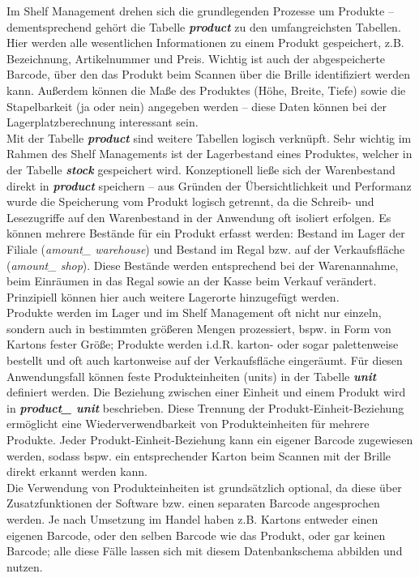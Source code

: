 Im Shelf Management drehen sich die grundlegenden Prozesse um Produkte -- dementsprechend gehört die Tabelle \textit{\textbf{product}} zu den umfangreichsten Tabellen. Hier werden alle wesentlichen Informationen zu einem Produkt gespeichert, z.B. Bezeichnung, Artikelnummer und Preis. Wichtig ist auch der abgespeicherte Barcode, über den das Produkt beim Scannen über die Brille identifiziert werden kann. Außerdem können die Maße des Produktes (Höhe, Breite, Tiefe) sowie die Stapelbarkeit (ja oder nein) angegeben werden -- diese Daten können bei der Lagerplatzberechnung interessant sein.\\

Mit der Tabelle \textit{\textbf{product}} sind weitere Tabellen logisch verknüpft. Sehr wichtig im Rahmen des Shelf Managements ist der Lagerbestand eines Produktes, welcher in der Tabelle \textit{\textbf{stock}} gespeichert wird. Konzeptionell ließe sich der Warenbestand direkt in \textit{\textbf{product}} speichern -- aus Gründen der Übersichtlichkeit und Performanz wurde die Speicherung vom Produkt logisch getrennt, da die Schreib- und Lesezugriffe auf den Warenbestand in der Anwendung oft isoliert erfolgen. Es können mehrere Bestände für ein Produkt erfasst werden: Bestand im Lager der Filiale (\textit{amount\_ warehouse}) und Bestand im Regal bzw. auf der Verkaufsfläche (\textit{amount\_ shop}). Diese Bestände werden entsprechend bei der Warenannahme, beim Einräumen in das Regal sowie an der Kasse beim Verkauf verändert. Prinzipiell können hier auch weitere Lagerorte hinzugefügt werden.\\

Produkte werden im Lager und im Shelf Management oft nicht nur einzeln, sondern auch in bestimmten größeren Mengen prozessiert, bspw. in Form von Kartons fester Größe; Produkte werden i.d.R. karton- oder sogar palettenweise bestellt und oft auch kartonweise auf der Verkaufsfläche eingeräumt. Für diesen Anwendungsfall können feste Produkteinheiten (\glqq units\grqq ) in der Tabelle \textit{\textbf{unit}} definiert werden. Die Beziehung zwischen einer Einheit und einem Produkt wird in \textit{\textbf{product\_ unit}} beschrieben. Diese Trennung der Produkt-Einheit-Beziehung ermöglicht eine Wiederverwendbarkeit von Produkteinheiten für mehrere Produkte. Jeder Produkt-Einheit-Beziehung kann ein eigener Barcode zugewiesen werden, sodass bspw. ein entsprechender Karton beim Scannen mit der Brille direkt erkannt werden kann.\\

Die Verwendung von Produkteinheiten ist grundsätzlich optional, da diese über Zusatzfunktionen der Software bzw. einen separaten Barcode angesprochen werden. Je nach Umsetzung im Handel haben z.B. Kartons entweder einen eigenen Barcode, oder den selben Barcode wie das Produkt, oder gar keinen Barcode; alle diese Fälle lassen sich mit diesem Datenbankschema abbilden und nutzen.\\


